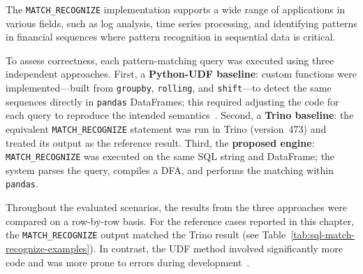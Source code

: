 The \texttt{MATCH\_RECOGNIZE} implementation supports a wide range of
applications in various fields, such as log analysis, time series
processing, and identifying patterns in financial sequences where
pattern recognition in sequential data is critical.

To assess correctness, each pattern-matching query was executed using
three independent approaches.  First, a \textbf{Python-UDF baseline}:
custom functions were implemented---built from \texttt{groupby},
\texttt{rolling}, and \texttt{shift}---to detect the same sequences
directly in \texttt{pandas} DataFrames; this required adjusting the
code for each query to reproduce the intended
semantics~\cite{Python_UDF}.  Second, a \textbf{Trino baseline}: the
equivalent \texttt{MATCH\_RECOGNIZE} statement was run in Trino
(version~473) and treated its output as the reference result.  Third,
the \textbf{proposed engine}: \texttt{MATCH\_RECOGNIZE} was executed
on the same SQL string and DataFrame; the system parses the query,
compiles a DFA, and performs the matching within \texttt{pandas}.

\noindent Throughout the evaluated scenarios, the results from the
three approaches were compared on a row-by-row basis.  For the
reference cases reported in this chapter, the
\texttt{MATCH\_RECOGNIZE} output matched the Trino result
(see Table~\ref{tab:sql-match-recognize-examples}).  In contrast, the
UDF method involved significantly more code and was more prone to
errors during development~\cite{Python_UDF}.

